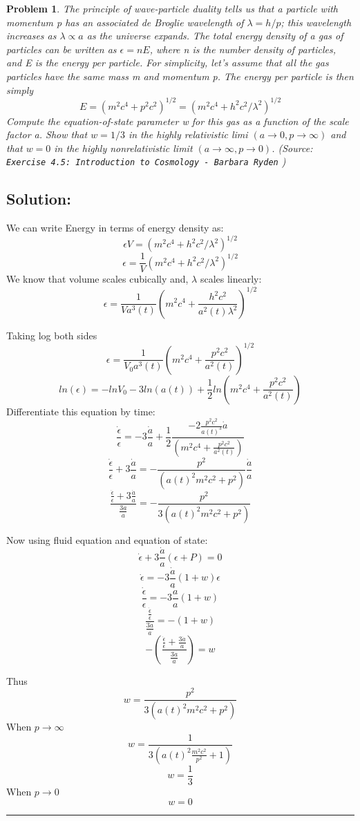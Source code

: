\documentclass[11pt]{article}
\newenvironment{solution}{\subsection*{Solution:}}{\vspace{0.5cm} \hrule \vspace{0.7cm}}
\newtheorem{problem}{Problem}
\begin{document}
\begin{problem}
	The principle of wave-particle duality tells us that a particle with momentum
	p has an associated de Broglie wavelength of $\lambda = h/p$; this
	wavelength increases as $\lambda \propto a$ as the universe expands. The total
	energy density of a gas of particles can be written as $\epsilon = nE$, where n is
	the number density of particles, and E is the energy per particle. For
	simplicity, let’s assume that all the gas particles have the same mass
	m and momentum p. The energy per particle is then simply
	$$ E = (m^2c^4 + p^2 c^2)^{1/2} =   (m^2c^4 + h^2 c^2 / \lambda^2)^{1/2}$$
	Compute the equation-of-state parameter w for this gas as a function
	of the scale factor a. Show that $w = 1/3$ in the highly relativistic limi
	$(a \rightarrow 0, p \rightarrow \infty)$ and that $w = 0$ in the highly nonrelativistic limit
	$(a \rightarrow \infty, p \rightarrow 0)$.
	(Source: \texttt{Exercise 4.5: Introduction to Cosmology - Barbara Ryden} )

\end{problem}

\begin{solution}
	We can write Energy in terms of energy density as:
	$$ \epsilon V = (m^2c^4 + h^2 c^2 / \lambda^2)^{1/2} $$
	$$ \epsilon  = \frac{1}{V} (m^2c^4 + h^2 c^2 / \lambda^2)^{1/2} $$
	We know that volume scales cubically and, $\lambda$ scales linearly:
	$$ \epsilon  = \frac{1}{Va^3(t)} \left(m^2c^4 + \frac{h^2 c^2}{a^2(t)
	\lambda^2} \right)^{1/2} $$

	Taking log both sides
	$$ \epsilon  =\frac{1}{V_0 a^3(t)} \left(m^2c^4 + \frac{p^2 c^2}{a^2(t)} \right)^{1/2} $$
	$$ ln(\epsilon)  = -ln V_0 - 3 ln(a(t)) + \frac{1}{2} ln\left(m^2c^4 + \frac{p^2 c^2}{a^2(t)} \right) $$
	Differentiate this equation by time:
	$$ \frac{\dot \epsilon}{\epsilon}  = - 3 \frac{\dot a}{a} + \frac{1}{2}
	\frac{ -2 \frac{p^2c^2 }{a(t)^3} \dot a}{\left(m^2c^4 + \frac{p^2 c^2}{a^2(t)} \right)} $$
	$$ \frac{\dot \epsilon}{\epsilon} + 3 \frac{\dot a}{a} = - \frac{ p^2
	}{\left( a(t)^2 m^2c^2 + p^2 \right)}\frac{\dot a}{a} $$
	$$ \frac{\frac{\dot \epsilon}{\epsilon} + 3 \frac{\dot a}{a}}{\frac{3\dot a}{a}} = - \frac{ p^2
	}{3\left( a(t)^2 m^2c^2 + p^2 \right)} $$

	Now using fluid equation and equation of state:
	$$ \dot \epsilon + 3 \frac{\dot a}{a}(\epsilon + P) = 0$$
	$$ \dot \epsilon =- 3 \frac{\dot a}{a}(1+w)\epsilon$$
	$$ \frac{\dot \epsilon}{\epsilon} =- 3 \frac{\dot a}{a}(1+w)$$
	$$ \frac{\frac{\dot \epsilon}{\epsilon}}{\frac{3\dot a}{a}} =- (1+w)$$
	$$ - \left(\frac{\frac{\dot \epsilon}{\epsilon}  +
		\frac{3\dot a}{a}}{\frac{3\dot a}{a}}
	\right) =w$$

	Thus
	$$ w = \frac{p^2}{3\left( a(t)^2 m^2c^2 + p^2 \right)}  $$
	When $p\rightarrow \infty$
	$$ w = \frac{1}{3\left( a(t)^2 \frac{m^2c^2}{p^2} + 1 \right)}  $$
	$$ w = \frac{1}{3}  $$
	When $p\rightarrow 0$
	$$ w = 0 $$
\end{solution}
\end{document}
